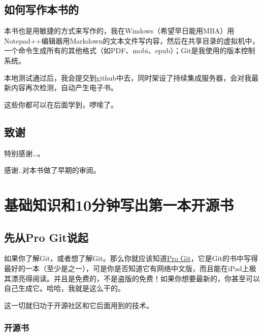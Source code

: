 \documentclass[a4paper]{book}
\makeatletter
\let\savedtitle=\@title
\renewcommand{\headrulewidth}{0pt}
\newcounter{tab}[chapter]
\newcommand{\chap}[1]{\newpage\thispagestyle{empty}\chapter{#1}\label{chap:\thechapter}}
\makeatother
\begin{document}
\section*{如何写作本书的}

本书也是用敏捷的方式来写作的，我在Windows（希望早日能用MBA）用Notepad++编辑器用Markdown的文本文件写内容，然后在共享目录的虚拟机中，一个命令生成所有的其他格式（如PDF、mobi、epub）；Git是我使用的版本控制系统。

本地测试通过后，我会提交到github中去，同时架设了持续集成服务器，会对我最新内容再次检测，自动产生电子书。

这些你都可以在后面学到，啰嗦了。

\section*{致谢}

特别感谢\ldots{}。

感谢..对本书做了早期的审阅。

\tableofcontents\newpage\thispagestyle{empty}


\fancyhf{}
\fancyhead[LE]{\color{colorheader}\quad\small\textbf\thepage\quad\quad\small\leftmark}
\fancyhead[RO]{\color{colorheader}\small\rightmark\quad\quad\small\textbf\thepage\quad}

\pagestyle{fancy}

\mainmatter
\chap{基础知识和10分钟写出第一本开源书}

\section{先从Pro Git说起}

如果你了解Git，或者想了解Git。那么你就应该知道\href{http://progit.org/}{Pro Git}，它是Git的书中写得最好的一本（至少是之一），可是你是否知道它有网络中文版，而且能在iPad上极其漂亮得阅读。并且是免费的，不是盗版的免费！如果你想要最新的，你甚至可以自己生成它。哈哈，我就是这么干的。

这一切就归功于开源社区和它后面用到的技术。

\subsection{开源书}
\end{document}
